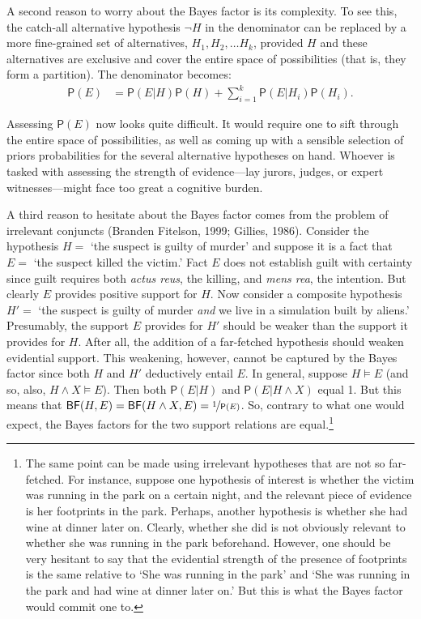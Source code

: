\documentclass[
  10pt,
  dvipsnames,enabledeprecatedfontcommands]{scrartcl}
\newcommand{\et}{\wedge}
\newcommand{\pr}[1]{\mathsf{P}(#1)}
\begin{document}
A second reason to worry about the Bayes factor is its complexity. To
see this, the catch-all alternative hypothesis \(\neg H\) in the
denominator can be replaced by a more fine-grained set of alternatives,
\(H_1, H_2, \dots H_k\), provided \(H\) and these alternatives are
exclusive and cover the entire space of possibilities (that is, they
form a partition). The denominator becomes:
\begin{align} \label{eq:lotpLong}
\pr{E} & = \pr{E\vert H}\pr{H} +\sum_{i=1}^k \pr{E\vert H_i}\pr{H_i}. 
\end{align}

\noindent Assessing \(\pr{E}\) now looks quite difficult. It would
require one to sift through the entire space of possibilities, as well
as coming up with a sensible selection of priors probabilities for the
several alternative hypotheses on hand. Whoever is tasked with assessing
the strength of evidence---lay jurors, judges, or expert
witnesses---might face too great a cognitive burden.

A third reason to hesitate about the Bayes factor comes from the problem
of irrelevant conjuncts (Branden Fitelson, 1999; Gillies, 1986).
Consider the hypothesis \(H =\) `the suspect is guilty of murder' and
suppose it is a fact that \(E =\) `the suspect killed the victim.' Fact
\(E\) does not establish guilt with certainty since guilt requires both
\emph{actus reus}, the killing, and \emph{mens rea}, the intention. But
clearly \(E\) provides positive support for \(H\). Now consider a
composite hypothesis \(H'=\) `the suspect is guilty of murder
\textit{and} we live in a simulation built by aliens.' Presumably, the
support \(E\) provides for \(H'\) should be weaker than the support it
provides for \(H\). After all, the addition of a far-fetched hypothesis
should weaken evidential support. This weakening, however, cannot be
captured by the Bayes factor since both \(H\) and \(H'\) deductively
entail \(E\). In general, suppose \(H\models E\) (and so, also,
\(H \et X \models E\)). Then both \(\pr{E\vert H}\) and
\(\pr{E \vert H \et X}\) equal 1. But this means that
\(\mathsf{BF}(H,E) = \mathsf{BF}(H \et X, E) = \nicefrac{1}{\pr{E}}\).
So, contrary to what one would expect, the Bayes factors for the two
support relations are equal.\footnote{The same point can be made using
  irrelevant hypotheses that are not so far-fetched. For instance,
  suppose one hypothesis of interest is whether the victim was running
  in the park on a certain night, and the relevant piece of evidence is
  her footprints in the park. Perhaps, another hypothesis is whether she
  had wine at dinner later on. Clearly, whether she did is not obviously
  relevant to whether she was running in the park beforehand. However,
  one should be very hesitant to say that the evidential strength of the
  presence of footprints is the same relative to `She was running in the
  park' and `She was running in the park and had wine at dinner later
  on.' But this is what the Bayes factor would commit one to.}
\end{document}

